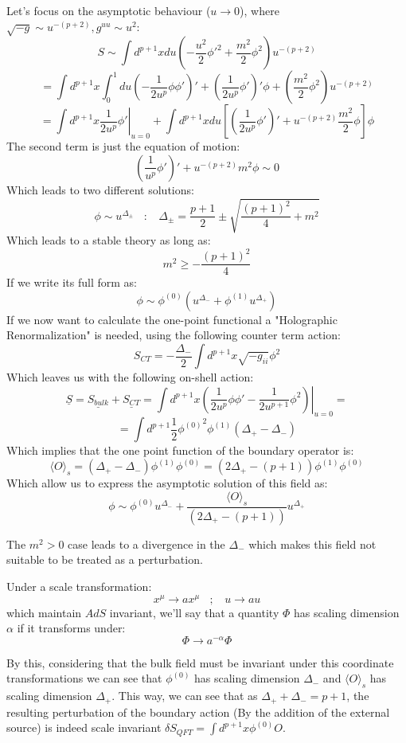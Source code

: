 \documentclass[12pt]{article}
\begin{document}
Let's focus on the asymptotic behaviour ($u\rightarrow 0$), where $\sqrt{-g} \sim u^{-(p+2)}, g^{uu} \sim u^2$:
\[
    S \sim \int d^{p+1}xdu\left(-\frac{u^2}{2}{\phi'}^2+\frac{m^2}{2}\phi^2\right) u^{-(p+2)}
\]
\[
    =\int d^{p+1}x\int_0^1du\left(-\frac{1}{2u^p}\phi\phi'\right)'+\left(\frac{1}{2u^p}\phi'\right)'\phi+\left(\frac{m^2}{2}\phi^2\right) u^{-(p+2)}
\]
\[
    =\int d^{p+1}x\left.\frac{1}{2u^p}\phi'\right|_{u=0} + \int d^{p+1}xdu\left[\left(\frac{1}{2u^p}\phi'\right)'+u^{-(p+2)}
        \frac{m^2}{2}\phi\right]\phi
\]
The second term is just the equation of motion:
\[
    \left(\frac{1}{u^p}\phi'\right)'+u^{-(p+2)}m^2 \phi \sim 0
\]
Which leads to two different solutions:
\[
    \phi\sim u^{\Delta_{\pm}} ~~~~:~~~~ \Delta_{\pm}=\frac{p+1}{2}\pm\sqrt{\frac{(p+1)^2}{4}+m^2}
\]
Which leads to a stable theory as long as:
\[
    m^2\geq -\frac{(p+1)^2}{4}
\]
If we write its full form as:
\[
    \phi\sim\phi^{(0)}\left(u^{\Delta_-}+\phi^{(1)}u^{\Delta_+}\right)
\]
If we now want to calculate the one-point functional a "Holographic Renormalization" is needed, using the following counter term action:
\[
    S_{CT}=-\frac{\Delta_-}{2}\int d^{p+1}x \sqrt{-g_{ii}}\phi^2
\]
Which leaves us with the following on-shell action:
\[
    \underline{S}=\underline{S_{bulk}}+\underline{S_{CT}}=\int d^{p+1}x\left.\left(\frac{1}{2u^p}\phi\phi'-\frac{1}{2u^{p+1}}\phi^2\right)\right|_{u=0}=
\]
\[
    = \int d^{p+1}\frac{1}{2}{\phi^{(0)}}^2\phi^{(1)}(\Delta_+-\Delta_-)
\]
Which implies that the one point function of the boundary operator is:
\[
    \langle O\rangle_s=(\Delta_+-\Delta_-)\phi^{(1)}\phi^{(0)} = (2\Delta_+-(p+1))\phi^{(1)}\phi^{(0)}
\]
Which allow us to express the asymptotic solution of this field as:
\[
    \phi\sim\phi^{(0)}u^{\Delta_-}+\frac{\langle O\rangle_s}{(2\Delta_+-(p+1))}u^{\Delta_+}
\]

The $m^2>0$ case leads to a divergence in the $\Delta_-$ which makes this field not suitable to be treated as a perturbation.

Under a scale transformation:
\[
    x^\mu\rightarrow ax^\mu ~~~~;~~~~ u\rightarrow au
\]
which maintain $AdS$ invariant, we'll say that a quantity $\Phi$ has scaling dimension $\alpha$ if it transforms under:
\[
    \Phi\rightarrow a^{-\alpha}\Phi
\]

By this, considering that the bulk field must be invariant under this coordinate transformations we can see that $\phi^{(0)}$ has scaling dimension $\Delta_-$ and $\langle O\rangle_s$ has scaling dimension $\Delta_+$. This way, we can see that as $\Delta_++\Delta_-=p+1$, the resulting perturbation of the boundary action (By the addition of the external source) is indeed scale invariant $\delta S_{QFT}=\int d^{p+1}x\phi^{(0)}O$.
\end{document}
